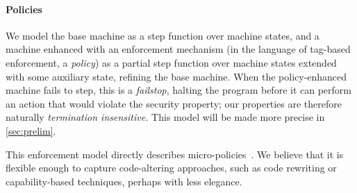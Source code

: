 \documentclass[acmsmall,review,anonymous]{acmart}\settopmatter{printfolios=true,printccs=false,printacmref=false}
\begin{document}
\paragraph*{Policies}

We model the base machine as a step function over machine states, and a machine enhanced with
an enforcement mechanism (in the language of tag-based enforcement, a {\em policy}) as
a partial step function over machine states extended with some auxiliary state, refining
the base machine. When the policy-enhanced machine fails to step, this is a {\em failstop},
halting the program before it can perform an action that would violate the security property;
our properties are therefore naturally \emph{termination insensitive.}
This model will be made more precise in \cref{sec:prelim}.



This enforcement model directly describes micro-policies~\citep{pump_oakland2015}.
We believe that it is flexible enough to capture code-altering approaches, such as code
rewriting or capability-based techniques, perhaps with less elegance.

\newcommand{\TAGS}{\mathcal{T}}
\newcommand{\tagname}{t}
\newcommand{\uP}{{\mu P}}
\end{document}
